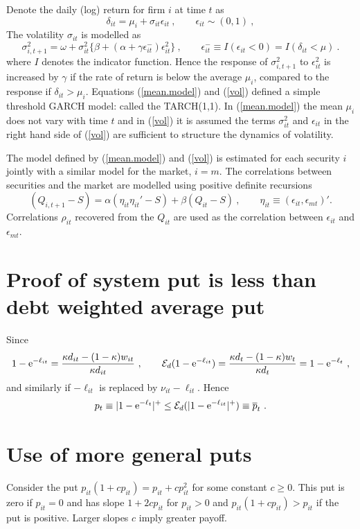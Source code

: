 \documentclass[12pt]{article}
\newcommand{\e}{\mathrm{e}}
\newcommand{\eps}{\epsilon}
\newcommand{\Ex}{{\cal E}}
\newcommand{\eref}[1]{(\ref{#1})}
\newcommand{\cq}{\ , \qquad}
\newcommand{\be}[1]{\begin{equation}\label{#1}}
\newcommand{\ee}{\end{equation}}
\begin{document}
Denote the daily (log) return for firm $i$ at time $t$ as
\newcommand{\vareps}{\varepsilon}
\be{mean.model}
\delta_{it}=\mu_i+\sigma_{it}\eps_{it}\cq \eps_{it}\sim (0,1)\ ,
\ee
The volatility $\sigma_{it}$ is modelled as
\be{vol}
\sigma_{i,t+1}^2 = \omega+ \sigma^2_{it}\{\beta+(\alpha+\gamma \eps^-_{it})\eps_{it}^2\}  \cq  \eps^-_{it}\equiv I(\eps_{it}<0)=I(\delta_{it}<\mu)\ .
\ee
where $I$ denotes the indicator function.  Hence the response of $\sigma_{i,t+1}^2$ to $\eps_{it}^2$  is increased by $\gamma$   if
the rate of return is below the average $\mu_i$, compared to the response if $\delta_{it}>\mu_i$.  Equations \eref{mean.model} and \eref{vol} defined a simple threshold GARCH model:  called the TARCH(1,1).   In \eref{mean.model} the mean $\mu_i$ does not vary with time $t$ and in \eref{vol} it is assumed the terms  $\sigma_{it}^2$ and $\eps_{it}$ in the right hand side of \eref{vol} are sufficient to structure the dynamics of volatility.

The model defined by \eref{mean.model} and \eref{vol} is estimated  for each security $i$ jointly with  a similar model for  the market,  $i=m$.   The correlations between securities and the market are modelled using  positive definite recursions   \citep{engle2002dynamic}
$$
(Q_{i,t+1}-S) = \alpha (\eta_{it}\eta_{it}'-S) + \beta (Q_{it}-S)\cq \eta_{it}\equiv(\eps_{it},\eps_{mt})' .
$$
Correlations $\rho_{it}$ recovered from the $Q_{it}$ are used as the correlation between $\eps_{it}$ and $\eps_{mt}$.

\section{Proof of system put is less   than debt weighted average put}\label{proof}
Since
$$
1-\e^{-\ell_{it}} = \frac{ \kappa d_{it} - (1-\kappa)w_{it}}{\kappa d_{it}}\cq \Ex_d (1-\e^{-\ell_{it}}) = \frac{\kappa d_t - (1-\kappa) w_t}{\kappa d_t} = 1-\e^{-\ell_t} \ ,
$$
and similarly if $-\ell_{it}$ is replaced by $\nu_{it}-\ell_{it}$.   Hence
$$
p_t\equiv |1-\e^{-\ell_t}|^+ \le \Ex_d (|1-\e^{-\ell_{it}}|^+)\equiv \overline p_t\ .
$$

\section{Use of more general puts}

Consider the put $p_{it}(1+cp_{it})=p_{it}+cp_{it}^2 $ for some constant $c\ge 0$.   This put is zero if $p_{it}=0$ and has slope $1+2cp_{it}$ for $p_{it}>0$ and $p_{it}(1+cp_{it})>p_{it}$ if the put is positive.  Larger slopes $c$ imply greater payoff.
\end{document}
